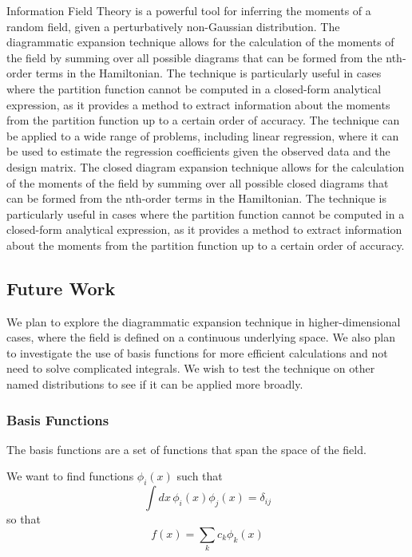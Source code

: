\documentclass[letterpaper,12pt]{article}
\begin{document}
Information Field Theory is a powerful tool for inferring the moments of a random field, given a perturbatively non-Gaussian distribution. The diagrammatic expansion technique allows for the calculation of the moments of the field by summing over all possible diagrams that can be formed from the nth-order terms in the Hamiltonian.
The technique is particularly useful in cases where the partition function cannot be computed in a closed-form analytical expression, as it provides a method to extract information about the moments from the partition function up to a certain order of accuracy.
The technique can be applied to a wide range of problems, including linear regression, where it can be used to estimate the regression coefficients given the observed data and the design matrix.
The closed diagram expansion technique allows for the calculation of the moments of the field by summing over all possible closed diagrams that can be formed from the nth-order terms in the Hamiltonian.
The technique is particularly useful in cases where the partition function cannot be computed in a closed-form analytical expression, as it provides a method to extract information about the moments from the partition function up to a certain order of accuracy.


\subsection{Future Work}
We plan to explore the diagrammatic expansion technique in higher-dimensional cases, where the field is defined on a continuous underlying space.
We also plan to investigate the use of basis functions for more efficient calculations and not need to solve complicated integrals.
We wish to test the technique on other named distributions to see if it can be applied more broadly.

\subsubsection{Basis Functions}

The basis functions are a set of functions that span the space of the field.

We want to find functions $\phi_{i}(x)$ such that
\begin{equation}
    \int dx \, \phi_{i}(x)\phi_{j}(x) = \delta_{ij}
\end{equation}
so that 
\begin{equation}
    f(x) = \sum_{k} c_{k}\phi_{k}(x)
\end{equation}
\end{document}
